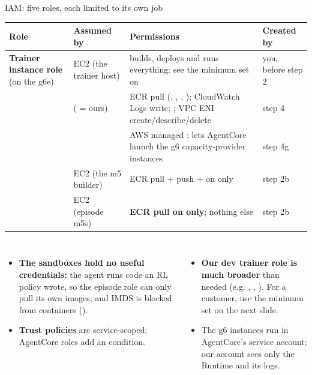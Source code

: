 \begin{frame}{IAM: five roles, each limited to its own job}
\tiny\setlength{\tabcolsep}{3pt}
\begin{tabularx}{\textwidth}{@{}P{0.18\textwidth}P{0.16\textwidth}Y P{0.13\textwidth}@{}}
\toprule
\textbf{Role} & \textbf{Assumed by} & \textbf{Permissions} & \textbf{Created by}\\
\midrule
\textbf{Trainer instance role} (on the g6e) & EC2 (the trainer host) & builds, deploys and runs everything: see the minimum set on  & you, before step 2\\
 &  ( = ours) & ECR pull (, , , ); CloudWatch Logs write; ; VPC ENI create/describe/delete & step 4\\
 &  & AWS managed : lets AgentCore launch the g6 capacity-provider instances & step 4g\\
 & EC2 (the m5 builder) & ECR pull + push +  on  only & step 2b\\
 & EC2 (episode m5s) & \textbf{ECR pull on  only}; nothing else & step 2b\\
\bottomrule
\end{tabularx}
\par\vspace{2mm}
\begin{columns}[T]
\begin{itemize}\tiny\setlength{\itemsep}{0.6mm}
\item \textbf{The sandboxes hold no useful credentials:} the agent runs code an RL policy wrote, so the
  episode role can only pull its own images, and IMDS is blocked from containers ().
\item \textbf{Trust policies} are service-scoped; AgentCore roles add an  condition.
\end{itemize}
\begin{itemize}\tiny\setlength{\itemsep}{0.6mm}
\item \textbf{Our dev trainer role is much broader} than needed (e.g. ,
  , ). For a customer, use the minimum set on the next slide.
\item The g6 instances run in AgentCore's service account; our account sees only the Runtime and its logs.
\end{itemize}
\end{columns}
\end{frame}

